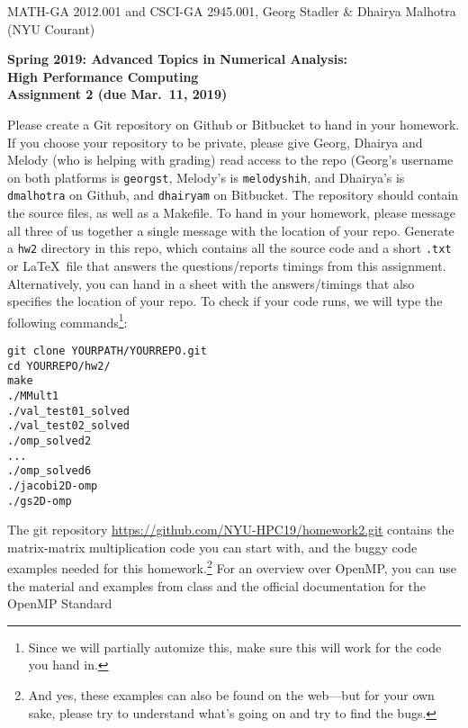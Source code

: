 \documentclass[12pt]{article}
\begin{document}
\begin{center}
  \vspace*{-2cm}
{\small MATH-GA 2012.001 and CSCI-GA 2945.001, Georg Stadler \&
  Dhairya Malhotra (NYU Courant)}
\end{center}
\vspace*{.5cm}
\begin{center}
\large \textbf{%
Spring 2019: Advanced Topics in Numerical Analysis: \\
High Performance Computing \\
Assignment 2 (due Mar.\ 11, 2019) }
\end{center}



 Please create a Git
repository on Github or Bitbucket to hand in your homework.  If you
choose your repository to be private, please give Georg, Dhairya and
Melody (who is helping with grading) read access to the repo (Georg's
username on both platforms is \texttt{georgst}, Melody's is
\texttt{melodyshih}, and Dhairya's is \texttt{dmalhotra} on Github,
and \texttt{dhairyam} on Bitbucket.
The repository should contain the source
files, as well as a Makefile.
To hand in your homework, please message all three of us together a
single message with the location of your repo. Generate a \texttt{hw2}
directory in this repo, which contains all the source code and a
short \texttt{.txt} or \LaTeX\ file that answers the questions/reports
timings from this assignment. Alternatively, you can hand in a sheet
with the answers/timings that also specifies the location of your
repo.  To check if your code runs, we will type the following
commands\footnote{Since we will partially automize this, make sure
  this will work for the code you hand in.}:
\begin{verbatim}
git clone YOURPATH/YOURREPO.git
cd YOURREPO/hw2/
make
./MMult1
./val_test01_solved
./val_test02_solved
./omp_solved2
...
./omp_solved6
./jacobi2D-omp
./gs2D-omp
\end{verbatim}
The git repository \url{https://github.com/NYU-HPC19/homework2.git}
contains the matrix-matrix multiplication code you can start with, and
the buggy code examples needed for this homework.\footnote{And
  yes, these examples can also be found on the web---but for your own
  sake, please try to understand what's going on and try to find the
  bugs.} For an overview over OpenMP, you can use the material and
examples from class and the official documentation for the OpenMP
Standard
\end{document}
